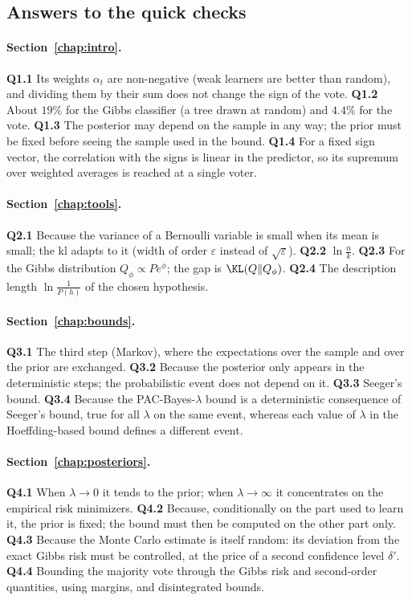 \subsection{Answers to the quick checks}\label{app:answers}

\paragraph{Section~\ref{chap:intro}.}
\textbf{Q1.1} Its weights $\alpha_t$ are non-negative (weak learners are better than
random), and dividing them by their sum does not change the sign of the vote.
\textbf{Q1.2} About $19\%$ for the Gibbs classifier (a tree drawn at random) and
$4.4\%$ for the vote.
\textbf{Q1.3} The posterior may depend on the sample in any way; the prior must be
fixed before seeing the sample used in the bound.
\textbf{Q1.4} For a fixed sign vector, the correlation with the signs is linear in
the predictor, so its supremum over weighted averages is reached at a single voter.

\paragraph{Section~\ref{chap:tools}.}
\textbf{Q2.1} Because the variance of a Bernoulli variable is small when its mean is
small; the kl adapts to it (width of order $\varepsilon$ instead of $\sqrt\varepsilon$).
\textbf{Q2.2} $\ln\frac nk$.
\textbf{Q2.3} For the Gibbs distribution $Q_\phi\propto Pe^{\phi}$; the gap is $\KL(Q\|Q_\phi)$.
\textbf{Q2.4} The description length $\ln\frac1{P(h)}$ of the chosen hypothesis.

\paragraph{Section~\ref{chap:bounds}.}
\textbf{Q3.1} The third step (Markov), where the expectations over the sample and
over the prior are exchanged.
\textbf{Q3.2} Because the posterior only appears in the deterministic steps; the
probabilistic event does not depend on it.
\textbf{Q3.3} Seeger's bound.
\textbf{Q3.4} Because the PAC-Bayes-$\lambda$ bound is a deterministic consequence of
Seeger's bound, true for all $\lambda$ on the same event, whereas each value of
$\lambda$ in the Hoeffding-based bound defines a different event.

\paragraph{Section~\ref{chap:posteriors}.}
\textbf{Q4.1} When $\lambda\to0$ it tends to the prior; when $\lambda\to\infty$ it
concentrates on the empirical risk minimizers.
\textbf{Q4.2} Because, conditionally on the part used to learn it, the prior is fixed;
the bound must then be computed on the other part only.
\textbf{Q4.3} Because the Monte Carlo estimate is itself random: its deviation from the
exact Gibbs risk must be controlled, at the price of a second confidence level $\delta'$.
\textbf{Q4.4} Bounding the majority vote through the Gibbs risk and second-order
quantities, using margins, and disintegrated bounds.

